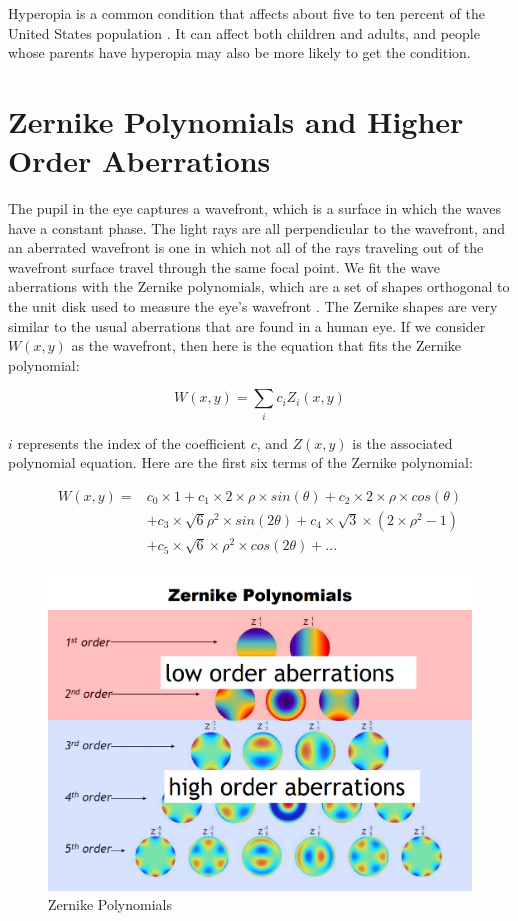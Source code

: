 Hyperopia is a common condition that affects about five to ten percent of the United States population \cite{NEI}. It can affect both children and adults, and people whose parents have hyperopia may also be more likely to get the condition.


\section{Zernike Polynomials and Higher Order Aberrations}

The pupil in the eye captures a wavefront, which is a surface in which the waves have a constant phase. The light rays are all perpendicular to the wavefront, and an aberrated wavefront is one in which not all of the rays traveling out of the wavefront surface travel through the same focal point. We fit the wave aberrations with the Zernike polynomials, which are a set of shapes orthogonal to the unit disk used to measure the eye’s wavefront \cite{Weisstein:Zernike}. The Zernike shapes are very similar to the usual aberrations that are found in a human eye. If we consider $W(x,y)$ as the wavefront, then here is the equation that fits the Zernike polynomial:

$$W(x,y)= \sum_{i} c_i Z_i (x,y)$$

$i$ represents the index of the coefficient $c$, and $Z(x,y)$ is the associated polynomial equation. Here are the first six terms of the Zernike polynomial:

\begin{equation}
\begin{aligned}
W(x,y) ={} & c_0 \times 1 + c_1 \times 2 \times \rho \times sin(\theta) + c_2 \times 2 \times \rho \times cos(\theta) \\
           & + c_3 \times \sqrt{6} \rho^2 \times sin(2\theta) + c_4 \times \sqrt{3} \times (2 \times \rho^2 - 1) \\
           & + c_5 \times \sqrt{6} \times \rho^2 \times cos(2\theta) + ...
\end{aligned}
\end{equation}

\begin{figure}[ht]
  \centering
  \includegraphics[width=5.0in]{chapters/chapter2/images/Zernike_polynomials.png}
  \caption{Zernike Polynomials \cite{Austin}}
  \label{fig:zernike}
\end{figure}

